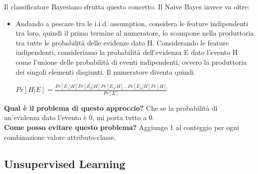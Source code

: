 Il classificatore Bayesiano sfrutta questo concetto. Il Naive Bayes invece va oltre: 
\\
\begin{itemize}
    \item Andando a pescare tra le i.i.d. assumption, considera le feature indipendenti tra loro, quindi il primo termine al numeratore, lo scompone nella produttoria tra tutte le probabilità delle evidenze dato H. Considerando le feature indipendenti, consideriamo la probabilità dell'evidenza E dato l'evento H come l'unione delle probabilità di eventi indipendenti, ovvero la produttoria dei singoli elementi disgiunti. Il numeratore diventa quindi
    \begin{center}
        \begin{math}
            Pr[ H | E] = \frac{Pr[E_1 | H] Pr[E_2 | H] Pr[E_3 | H] ... Pr[E_n | H] Pr[H]}{Pr[E]}
        \end{math}
    \end{center}
\end{itemize}
\textbf{Qual è il problema di questo approccio?} Che se la probabilità di un'evidenza dato l'evento è 0, mi porta tutto a 0. 
\\
\textbf{Come posso evitare questo problema?} Aggiungo 1 al conteggio per ogni combinazione valore attributo-classe. 

\newpage    

\subsection{Unsupervised Learning}

